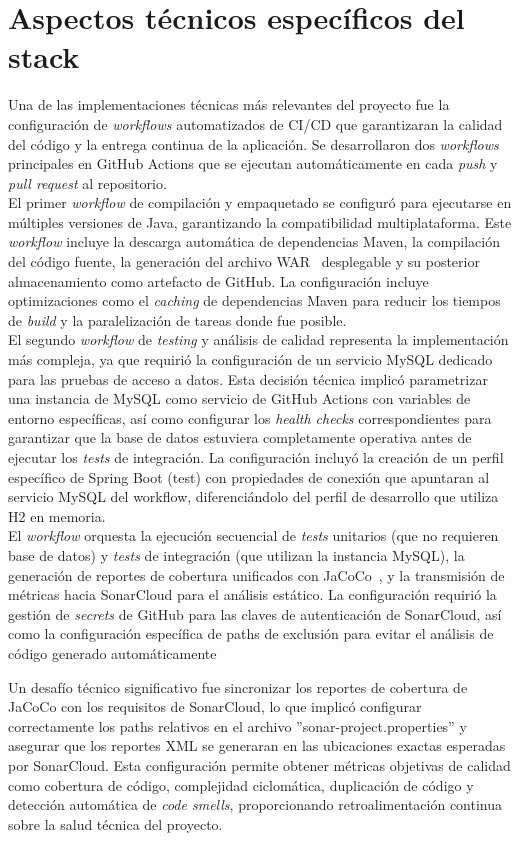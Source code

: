 \section{Aspectos técnicos específicos del stack}\label{aspectos-terncicos-del-stack}
Una de las implementaciones técnicas más relevantes del proyecto fue la configuración de \emph{workflows} automatizados de CI/CD que garantizaran la calidad del código y la entrega continua de la aplicación. Se desarrollaron dos \emph{workflows} principales en GitHub Actions que se ejecutan automáticamente en cada \emph{push} y \emph{pull request} al repositorio.\\
El primer \emph{workflow} de compilación y empaquetado se configuró para ejecutarse en múltiples versiones de Java, garantizando la compatibilidad multiplataforma. Este \emph{workflow} incluye la descarga automática de dependencias Maven, la compilación del código fuente, la generación del archivo WAR~\cite{war} desplegable y su posterior almacenamiento como artefacto de GitHub. La configuración incluye optimizaciones como el \emph{caching} de dependencias Maven para reducir los tiempos de \emph{build} y la paralelización de tareas donde fue posible.\\
El segundo \emph{workflow} de \emph{testing} y análisis de calidad representa la implementación más compleja, ya que requirió la configuración de un servicio MySQL dedicado para las pruebas de acceso a datos. Esta decisión técnica implicó parametrizar una instancia de MySQL como servicio de GitHub Actions con variables de entorno específicas, así como configurar los \emph{health checks} correspondientes para garantizar que la base de datos estuviera completamente operativa antes de ejecutar los \emph{tests} de integración. La configuración incluyó la creación de un perfil específico de Spring Boot (test) con propiedades de conexión que apuntaran al servicio MySQL del workflow, diferenciándolo del perfil de desarrollo que utiliza H2 en memoria.\\
El \emph{workflow} orquesta la ejecución secuencial de \emph{tests} unitarios (que no requieren base de datos) y \emph{tests} de integración (que utilizan la instancia MySQL), la generación de reportes de cobertura unificados con JaCoCo~\cite{jacoco}, y la transmisión de métricas hacia SonarCloud para el análisis estático. La configuración requirió la gestión de \emph{secrets} de GitHub para las claves de autenticación de SonarCloud, así como la configuración específica de paths de exclusión para evitar el análisis de código generado automáticamente

Un desafío técnico significativo fue sincronizar los reportes de cobertura de JaCoCo con los requisitos de SonarCloud, lo que implicó configurar correctamente los paths relativos en el archivo ''sonar-project.properties'' y asegurar que los reportes XML se generaran en las ubicaciones exactas esperadas por SonarCloud. Esta configuración permite obtener métricas objetivas de calidad como cobertura de código, complejidad ciclomática, duplicación de código y detección automática de \emph{code smells}, proporcionando retroalimentación continua sobre la salud técnica del proyecto.
